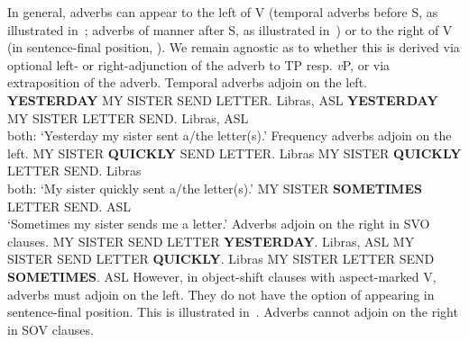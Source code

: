 \documentclass[output=paper,colorlinks,citecolor=brown,
]{langscibook}
\begin{document}
In general, adverbs can appear to the left of V (temporal
adverbs before S, as illustrated in~; adverbs of manner after S, as
illustrated in~) or to the right of V (in sentence-final position,
). We remain agnostic as to whether this is derived via optional
left- or right-adjunction of the adverb to TP resp. \textit{v}P, or via
extraposition of the adverb.
\ea 
    \label{lasz:ex:20}
    Temporal adverbs adjoin on the left.
    \ea 
        \textbf{YESTERDAY} MY SISTER SEND\laszPlain{} LETTER.
        \hfill 
        \cmark Libras, \cmark ASL 
    \ex 
        \textbf{YESTERDAY} MY SISTER LETTER SEND\laszAsp{}.
        \hfill 
        \cmark Libras, \cmark ASL 
        \\ 
        both: ‘Yesterday my sister sent a/the letter(s).’
    \z 
\ex 
    \label{lasz:ex:21}
    Frequency adverbs adjoin on the left.
    \ea 
        MY SISTER \textbf{QUICKLY} SEND\laszPlain{} LETTER.
        \hfill 
        \cmark Libras 
    \ex 
        MY SISTER \textbf{QUICKLY} LETTER SEND\laszAsp{}.
        \hfill 
        \cmark Libras 
        \\ 
        both: ‘My sister quickly sent a/the letter(s).’
    \ex 
        MY SISTER \textbf{SOMETIMES} LETTER SEND.
        \hfill 
        \cmark ASL 
        \\ 
        ‘Sometimes my sister sends me a letter.’
    \z 
\ex 
    \label{lasz:ex:22}
    Adverbs adjoin on the right in SVO clauses.
    \ea 
        MY SISTER SEND\laszPlain{} LETTER \textbf{YESTERDAY}.
        \hfill 
        \cmark Libras, \cmark ASL 
    \ex 
        MY SISTER SEND\laszPlain{} LETTER \textbf{QUICKLY}.
        \hfill 
        \cmark Libras 
    \ex 
        MY SISTER LETTER SEND \textbf{SOMETIMES}.
        \hfill 
        \cmark ASL 
    \z 
\z 
However, in object-shift clauses with aspect-marked V, adverbs must
adjoin on the left. They do not have the option of appearing in
sentence-final position. This is illustrated in~.
\ea 
    \label{lasz:ex:23}
    Adverbs cannot adjoin on the right in SOV\laszAsp{} clauses.
    \z 
\z 
\end{document}
